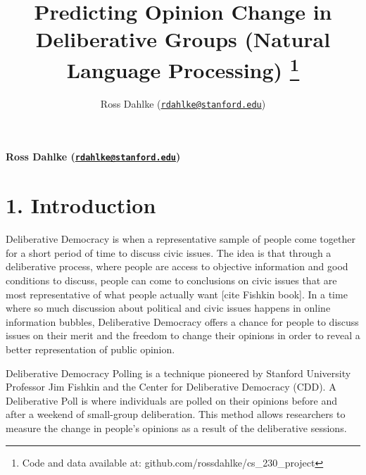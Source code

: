 \documentclass[11pt,]{article}
\title{Predicting Opinion Change in Deliberative Groups (Natural Language
Processing) \thanks{Code and data available at: github.com/rossdahlke/cs\_230\_project}  }
\author{\Large Ross Dahlke
(\href{mailto:rdahlke@stanford.edu}{\nolinkurl{rdahlke@stanford.edu}})\vspace{0.05in} \newline\normalsize\emph{}  }
\date{}
\newcommand*{\authorfont}{\fontfamily{phv}\selectfont}
\begin{document}
	
%

{%
\setlength{\parindent}{0pt}
\thispagestyle{plain}
{\fontsize{18}{20}\selectfont\raggedright 
\maketitle  %

}

{
   \vskip 13.5pt\relax \normalsize\fontsize{11}{12} 
\textbf{\authorfont Ross Dahlke
(\href{mailto:rdahlke@stanford.edu}{\nolinkurl{rdahlke@stanford.edu}})} \hskip 15pt \emph{\small }   

}

}






\vskip -8.5pt



\noindent \singlespacing 

\hypertarget{introduction}{%
\section{1. Introduction}\label{introduction}}

Deliberative Democracy is when a representative sample of people come
together for a short period of time to discuss civic issues. The idea is
that through a deliberative process, where people are access to
objective information and good conditions to discuss, people can come to
conclusions on civic issues that are most representative of what people
actually want {[}cite Fishkin book{]}. In a time where so much
discussion about political and civic issues happens in online
information bubbles, Deliberative Democracy offers a chance for people
to discuss issues on their merit and the freedom to change their
opinions in order to reveal a better representation of public opinion.

Deliberative Democracy Polling is a technique pioneered by Stanford
University Professor Jim Fishkin and the Center for Deliberative
Democracy (CDD). A Deliberative Poll is where individuals are polled on
their opinions before and after a weekend of small-group deliberation.
This method allows researchers to measure the change in people's
opinions as a result of the deliberative sessions.
\end{document}

